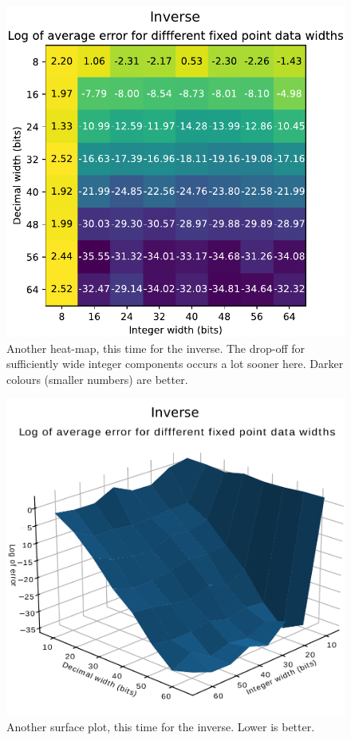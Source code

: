 \documentclass[12pt]{article}
\begin{document}
\begin{figure}[thp]
	\centering
	
	\includegraphics[width=\textwidth]{heatmap_full_inv.pdf}
	
	\caption{Another heat-map, this time for the inverse. The drop-off for sufficiently wide integer components occurs a lot sooner here. Darker colours (smaller numbers) are better.}
	\label{full_heat_inv}
\end{figure}

\begin{figure}[thp]
	\centering
	
	\includegraphics[width=\textwidth]{sfc_plot_full_inv.pdf}
	
	\caption{Another surface plot, this time for the inverse. Lower is better.}
	\label{full_sfc_inv}
\end{figure}
\end{document}
